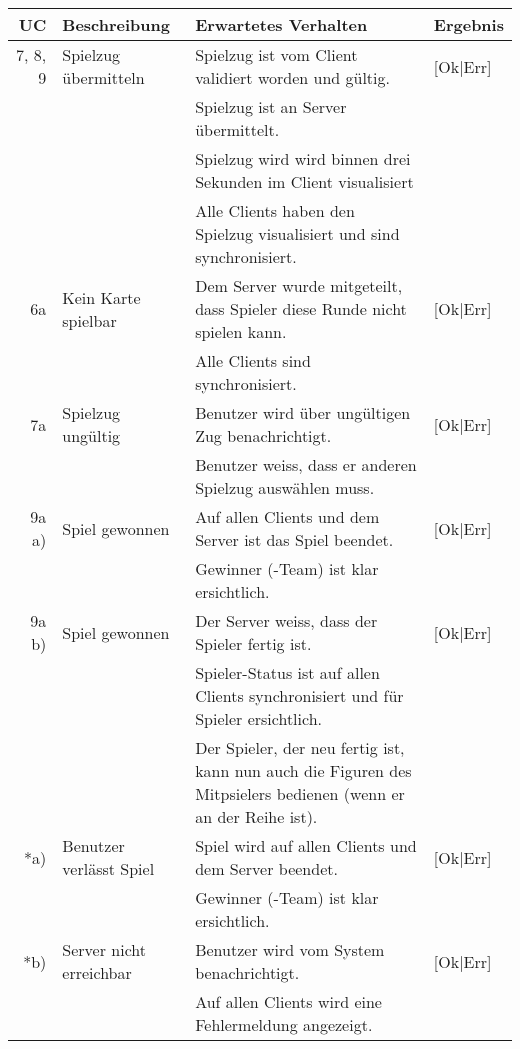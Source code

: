 \documentclass[12pt,halfparskip]{scrartcl}
\begin{document}

\begin {tabular}{r | p{3cm} | p{8cm} | l}
\toprule
\textbf{UC} & \textbf{Beschreibung} & \textbf{Erwartetes Verhalten} & \textbf{Ergebnis} \\
\midrule
7, 8, 9 & Spielzug übermitteln & Spielzug ist vom Client validiert worden und gültig. & [Ok|Err] \\
 \cline{3-4} & & Spielzug ist an Server übermittelt. & \\
 \cline{3-4} & & Spielzug wird wird binnen drei Sekunden im Client visualisiert & \\
 \cline{3-4} & & Alle Clients haben den Spielzug visualisiert und sind synchronisiert. & \\
\midrule
6a & Kein Karte spielbar & Dem Server wurde mitgeteilt, dass Spieler diese Runde nicht spielen kann. & [Ok|Err] \\
 \cline{3-4} & & Alle Clients sind synchronisiert. & \\
\midrule
7a & Spielzug ungültig & Benutzer wird über ungültigen Zug benachrichtigt. & [Ok|Err] \\
 \cline{3-4} & & Benutzer weiss, dass er anderen Spielzug auswählen muss. & \\
\midrule
9a a) & Spiel gewonnen & Auf allen Clients und dem Server ist das Spiel beendet. & [Ok|Err] \\
 \cline{3-4} & & Gewinner (-Team) ist klar ersichtlich. & \\
\midrule
9a b) & Spiel gewonnen & Der Server weiss, dass der Spieler fertig ist. & [Ok|Err] \\
 \cline{3-4} & & Spieler-Status ist auf allen Clients synchronisiert und für Spieler ersichtlich. & \\
 \cline{3-4} & & Der Spieler, der neu fertig ist, kann nun auch die Figuren des Mitpsielers bedienen (wenn er an der Reihe ist). & \\
\midrule
*a) & Benutzer verlässt Spiel & Spiel wird auf allen Clients und dem Server beendet. & [Ok|Err] \\
 \cline{3-4} & & Gewinner (-Team) ist klar ersichtlich. & \\
\midrule
*b) & Server nicht erreichbar & Benutzer wird vom System benachrichtigt. & [Ok|Err] \\
 \cline{3-4} & & Auf allen Clients wird eine Fehlermeldung angezeigt. & \\
\bottomrule
\end{tabular}
\end{document}
